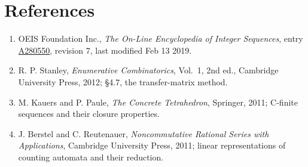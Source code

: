 \documentclass[11pt]{article}
\theoremstyle{definition}
\begin{document}
\section{References}

\begin{enumerate}

\item OEIS Foundation Inc., \emph{The On-Line Encyclopedia of Integer Sequences}, entry \href{https://oeis.org/A280550}{A280550}, revision 7, last modified Feb 13 2019.

\item R. P. Stanley, \emph{Enumerative Combinatorics}, Vol.~1, 2nd ed., Cambridge University Press, 2012; \S4.7, the transfer-matrix method.

\item M. Kauers and P. Paule, \emph{The Concrete Tetrahedron}, Springer, 2011; C-finite sequences and their closure properties.

\item J. Berstel and C. Reutenauer, \emph{Noncommutative Rational Series with Applications}, Cambridge University Press, 2011; linear representations of counting automata and their reduction.

\end{enumerate}
\end{document}
